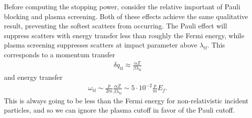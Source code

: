 \documentclass[twocolumn,preprintnumbers,amsmath,amssymb,prd, superscriptaddress]{revtex4} %
\begin{document}
\begin{appendices}
Before computing the stopping power, consider the relative important of Pauli blocking and plasma screening.
Both of these effects achieve the same qualitative result, preventing the softest scatters from occurring.
The Pauli effect will suppress scatters with energy transfer less than roughly the Fermi energy, while plasma screening suppresses scatters at impact parameter above $\lambda_\text{tf}$.
This corresponds to a momentum transfer
\begin{align}
      \delta q_\text{tf} \approx \frac{\alpha Z}{\beta \lambda_\text{tf}}
\end{align}
and energy transfer
\begin{align}
  \label{eq:cuttoff_compare}
  \omega_\text{tf} \sim \frac{p}{2m} \frac{\alpha Z}{\beta \lambda_\text{tf}}
         \sim 5 \cdot 10^{-2} \frac{p}{m} E_f.
\end{align}
This is always going to be less than the Fermi energy for non-relativistic incident particles, and so we can ignore the plasma cutoff in favor of the Pauli cutoff.


\end{appendices}
\end{document}
